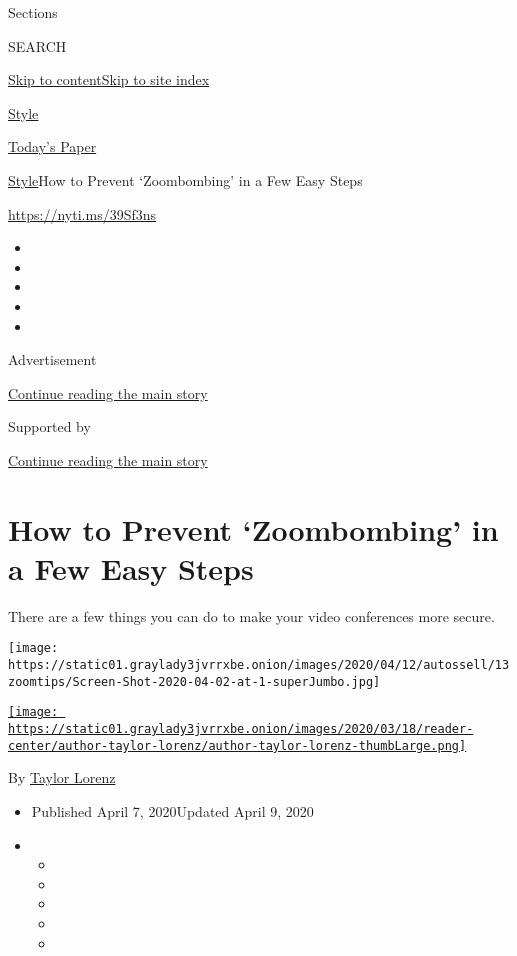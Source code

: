 Sections

SEARCH

\protect\hyperlink{site-content}{Skip to
content}\protect\hyperlink{site-index}{Skip to site index}

\href{https://www.nytimes3xbfgragh.onion/section/style}{Style}

\href{https://myaccount.nytimes3xbfgragh.onion/auth/login?response_type=cookie\&client_id=vi}{}

\href{https://www.nytimes3xbfgragh.onion/section/todayspaper}{Today's
Paper}

\href{/section/style}{Style}\textbar{}How to Prevent `Zoombombing' in a
Few Easy Steps

\url{https://nyti.ms/39Sf3ns}

\begin{itemize}
\item
\item
\item
\item
\item
\end{itemize}

Advertisement

\protect\hyperlink{after-top}{Continue reading the main story}

Supported by

\protect\hyperlink{after-sponsor}{Continue reading the main story}

\hypertarget{how-to-prevent-zoombombing-in-a-few-easy-steps}{%
\section{How to Prevent `Zoombombing' in a Few Easy
Steps}\label{how-to-prevent-zoombombing-in-a-few-easy-steps}}

There are a few things you can do to make your video conferences more
secure.

\texttt{[image: https://static01.graylady3jvrrxbe.onion/images/2020/04/12/autossell/13zoomtips/Screen-Shot-2020-04-02-at-1-superJumbo.jpg]}

\href{https://www.nytimes3xbfgragh.onion/by/taylor-lorenz}{\texttt{[image: https://static01.graylady3jvrrxbe.onion/images/2020/03/18/reader-center/author-taylor-lorenz/author-taylor-lorenz-thumbLarge.png]}}

By \href{https://www.nytimes3xbfgragh.onion/by/taylor-lorenz}{Taylor
Lorenz}

\begin{itemize}
\item
  Published April 7, 2020Updated April 9, 2020
\item
  \begin{itemize}
  \item
  \item
  \item
  \item
  \item
  \end{itemize}
\end{itemize}

